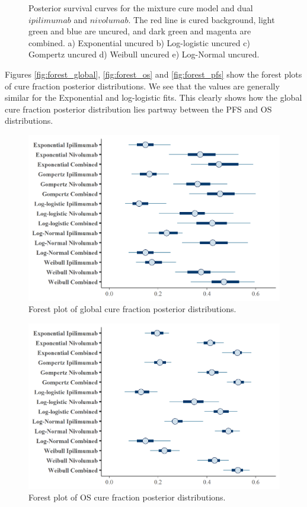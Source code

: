 \documentclass[
]{article}
\begin{document}
\begin{figure}
{}

\caption{\label{fig:NIVO+IPI}Posterior survival curves for the mixture cure model and dual $ipilimumab$ and $nivolumab$. The red line is cured background, light green and blue are uncured, and dark green and magenta are combined. a) Exponential uncured b) Log-logistic uncured c) Gompertz uncured d) Weibull uncured e) Log-Normal uncured.}\label{fig:unnamed-chunk-5}
\end{figure}

Figures \ref{fig:forest_global}, \ref{fig:forest_os} and
\ref{fig:forest_pfs} show the forest plots of cure fraction posterior
distributions. We see that the values are generally similar for the
Exponential and log-logistic fits. This clearly shows how the global
cure fraction posterior distribution lies partway between the PFS and OS
distributions.

\begin{figure}

{\centering \includegraphics[width=0.6\linewidth]{../plots/cf_global_forest_plot} 

}

\caption{\label{fig:forest_global}Forest plot of global cure fraction posterior distributions.}\label{fig:unnamed-chunk-6}
\end{figure}

\begin{figure}

{\centering \includegraphics[width=0.6\linewidth]{../plots/cf_os_forest_plot} 

}

\caption{\label{fig:forest_os}Forest plot of OS cure fraction posterior distributions.}\label{fig:unnamed-chunk-7}
\end{figure}
\end{document}
